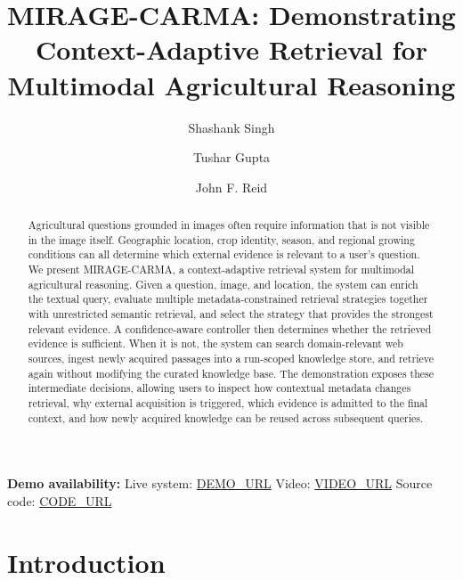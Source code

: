 \documentclass[runningheads]{llncs}
\begin{document}
\title{MIRAGE-CARMA: Demonstrating Context-Adaptive Retrieval for Multimodal Agricultural Reasoning}

\author{Shashank Singh \and Tushar Gupta \and John F. Reid}

\maketitle

\begin{abstract}
Agricultural questions grounded in images often require information that is not visible in the image itself. Geographic location, crop identity, season, and regional growing conditions can all determine which external evidence is relevant to a user's question. We present MIRAGE-CARMA, a context-adaptive retrieval system for multimodal agricultural reasoning. Given a question, image, and location, the system can enrich the textual query, evaluate multiple metadata-constrained retrieval strategies together with unrestricted semantic retrieval, and select the strategy that provides the strongest relevant evidence. A confidence-aware controller then determines whether the retrieved evidence is sufficient. When it is not, the system can search domain-relevant web sources, ingest newly acquired passages into a run-scoped knowledge store, and retrieve again without modifying the curated knowledge base. The demonstration exposes these intermediate decisions, allowing users to inspect how contextual metadata changes retrieval, why external acquisition is triggered, which evidence is admitted to the final context, and how newly acquired knowledge can be reused across subsequent queries.
\end{abstract}

\noindent\textbf{Demo availability:}
Live system: \url{DEMO_URL}\quad
Video: \url{VIDEO_URL}\quad
Source code: \url{CODE_URL}


\section{Introduction}
\end{document}
